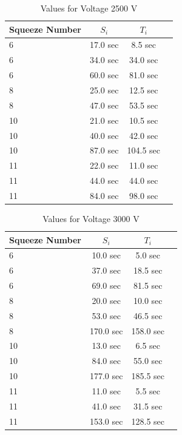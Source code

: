 \documentclass[aps,twocolumn,secnumarabic,nobalancelastpage,amsmath,amssymb,
nofootinbib]{revtex4}
\begin{document}
\begin{center}
\begin{table}[htbp]
\begin{tabular}{|l|c|c|r|}
\hline
{\small Squeeze Number} & { \small ${S}_{i}$} & {\small  ${T}_{i} $ } \\
\hline
6& 17.0 sec & 8.5 sec  \\
6& 34.0 sec & 34.0 sec  \\
6& 60.0 sec & 81.0 sec  \\
8& 25.0 sec & 12.5 sec  \\
8& 47.0 sec & 53.5 sec  \\
10& 21.0 sec & 10.5 sec  \\
10& 40.0 sec & 42.0 sec  \\
10& 87.0 sec & 104.5 sec  \\
11& 22.0 sec & 11.0 sec  \\
11& 44.0 sec & 44.0 sec  \\
11& 84.0 sec & 98.0 sec  \\


\hline
\end{tabular}
\caption{\label{tab:linfitresults} Values for Voltage 2500 V }
\end{table}
\end{center}

\begin{center}
\begin{table}[htbp]
\begin{tabular}{|l|c|c|r|}
\hline
{\small Squeeze Number} & { \small ${S}_{i}$} & {\small  ${T}_{i} $ } \\
\hline
6& 10.0 sec & 5.0 sec  \\
6& 37.0 sec & 18.5 sec  \\
6& 69.0 sec & 81.5 sec  \\
8& 20.0 sec & 10.0 sec  \\
8& 53.0 sec & 46.5 sec  \\
8& 170.0 sec & 158.0 sec  \\
10& 13.0 sec & 6.5 sec  \\
10& 84.0 sec & 55.0 sec  \\
10& 177.0 sec & 185.5 sec  \\
11& 11.0 sec & 5.5 sec  \\
11& 41.0 sec & 31.5 sec  \\
11& 153.0 sec & 128.5 sec  \\



\hline
\end{tabular}
\caption{\label{tab:linfitresults} Values for Voltage 3000 V }
\end{table}
\end{center}
\end{document}
